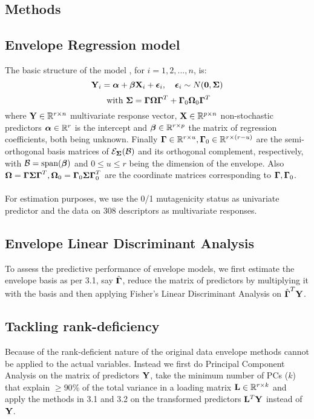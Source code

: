 \documentclass[8pt]{llncs}
\begin{document}
\begin{multicols}{2}
\section{Methods}
\subsection{Envelope Regression model} The basic structure of the model \cite{cook}, for $i = 1,2,...,n $, is:
$$ {\mathbf{Y}}_i = {\boldsymbol{\alpha}} + {\boldsymbol{\beta}}{\mathbf{X}}_i + {\boldsymbol{\epsilon}}_i,\quad {\boldsymbol{\epsilon}}_i\sim N({\mathbf{0}},{\boldsymbol{\Sigma}})$$
$$\mbox{ with }{\boldsymbol{\Sigma}} = {\boldsymbol{\Gamma}}{\boldsymbol{\Omega}}{\boldsymbol{\Gamma}}^T + {\boldsymbol{\Gamma}}_0{\boldsymbol{\Omega}}_0{\boldsymbol{\Gamma}}^T$$
where ${\mathbf{Y}}\in{\mathbb{R}}^{r\times n}$ multivariate response vector, ${\mathbf{X}}\in{\mathbb{R}}^{p\times n}$ non-stochastic predictors ${\boldsymbol{\alpha}}\in{\mathbb{R}}^r$ is the intercept and ${\boldsymbol{\beta}}\in{\mathbb{R}}^{r\times p}$ the matrix of regression coefficients, both being unknown. Finally ${\boldsymbol{\Gamma}}\in{\mathbb{R}}^{r\times u},{\boldsymbol{\Gamma}}_0\in{\mathbb{R}}^{r\times (r-u)}$ are the semi-orthogonal basis matrices of ${\cal{E}}_{\boldsymbol{\Sigma}}({\cal{B}})$ and its orthogonal complement, respectively, with ${\cal{B}} = \mbox{span}({\boldsymbol{\beta}})$ and $0\leq u\leq r$ being the dimension of the envelope. Also ${\boldsymbol{\Omega}} = {\boldsymbol{\Gamma}}{\boldsymbol{\Sigma}}{\boldsymbol{\Gamma}}^T, {\boldsymbol{\Omega}}_0 = {\boldsymbol{\Gamma}}_0{\boldsymbol{\Sigma}}{\boldsymbol{\Gamma}}_0^T$ are the coordinate matrices corresponding to ${\boldsymbol{\Gamma}}, {\boldsymbol{\Gamma}}_0$.
\paragraph{}For estimation purposes, we use the 0/1 mutagenicity status as univariate predictor and the data on 308 descriptors as multivariate responses.

\subsection{Envelope Linear Discriminant Analysis}To assess the predictive performance of envelope models, we first estimate the envelope basis as per 3.1, say $\hat{{\boldsymbol{\Gamma}}}$, reduce the matrix of predictors by multiplying it with the basis and then applying Fisher's Linear Discriminant Analysis \cite{fish} on $\hat{{\boldsymbol{\Gamma}}}^T{\mathbf{Y}}$.

\subsection{Tackling rank-deficiency} Because of the rank-deficient nature of the original data envelope methods cannot be applied to the actual variables. Instead we first do Principal Component Analysis on the matrix of predictors ${\mathbf{Y}}$, take the minimum number of PCs ($k$) that explain $\geq 90\%$ of the total variance in a loading matrix ${\mathbf{L}}\in{\mathbb{R}}^{r\times k}$ and apply the methods in 3.1 and 3.2 on the transformed predictors ${\mathbf{L}}^T{\mathbf{Y}}$ instead of ${\mathbf{Y}}$. 


\end{multicols}
\end{document}
